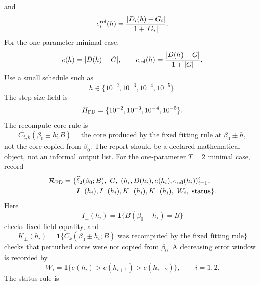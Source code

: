 \documentclass[11pt]{article}
\numberwithin{equation}{section}
\newcommand{\ind}{\mathbf 1}
\newcommand{\widehatell}{\widehat\ell}
\begin{document}
and
\begin{equation}
    e_i^{\rm rel}(h)
    =
    \frac{|D_i(h)-G_i|}{1+|G_i|}.
    \label{eq:p24-p19-99}
\end{equation}
For the one-parameter minimal case,
\begin{equation}
    e(h)=|D(h)-G|,
    \qquad
    e_{\rm rel}(h)=\frac{|D(h)-G|}{1+|G|}.
    \label{eq:p24-p22-fd0c}
\end{equation}
Use a small schedule such as
\begin{equation}
    h\in\{10^{-2},10^{-3},10^{-4},10^{-5}\}.
    \label{eq:p24-p19-100}
\end{equation}
The step-size field is
\begin{equation}
    H_{\rm FD}=\{10^{-2},10^{-3},10^{-4},10^{-5}\}.
    \label{eq:p24-p22-fd0d}
\end{equation}
The recompute-core rule is
\begin{equation}
    C_{t,k}(\beta_0\pm h;B)
    =
    \text{the core produced by the fixed fitting rule at }\beta_0\pm h,
    \label{eq:p24-p22-fd0e}
\end{equation}
not the core copied from \(\beta_0\).
The report should be a declared mathematical object, not an informal output
list.
For the one-parameter \(T=2\) minimal case, record
\begin{equation}
\begin{aligned}
    \mathcal R_{\rm FD}
    =
    \{&
    \widehatell_2(\beta_0;B),\
    G,\
    (h_i,D(h_i),e(h_i),e_{\rm rel}(h_i))_{i=1}^{4},\\
    &I_-(h_i),I_+(h_i),K_-(h_i),K_+(h_i),\
    W_i,\ \text{status}\}.
\end{aligned}
\label{eq:p24-p22-fd1}
\end{equation}
Here
\begin{equation}
    I_\pm(h_i)
    =
    \ind\{B(\beta_0\pm h_i)=B\}
    \label{eq:p24-p22-fd2}
\end{equation}
checks fixed-field equality, and
\begin{equation}
    K_\pm(h_i)
    =
    \ind\{C_k(\beta_0\pm h_i;B)
    \text{ was recomputed by the fixed fitting rule}\}
    \label{eq:p24-p22-fd3}
\end{equation}
checks that perturbed cores were not copied from \(\beta_0\).  A decreasing
error window is recorded by
\begin{equation}
    W_i=\ind\{e(h_i)>e(h_{i+1})>e(h_{i+2})\},
    \qquad i=1,2.
    \label{eq:p24-p22-fd4}
\end{equation}
The status rule is
\end{document}
